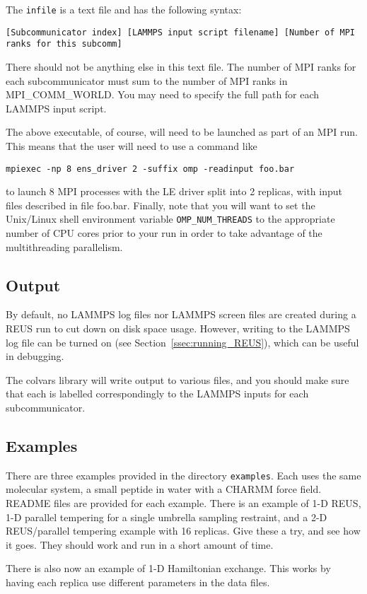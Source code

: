 \documentclass[10pt]{article}
\begin{document}
The \texttt{infile} is a text file and has the following syntax:
\begin{verbatim}
[Subcommunicator index] [LAMMPS input script filename] [Number of MPI ranks for this subcomm]
\end{verbatim}
There should not be anything else in this text file. The number of MPI ranks
for each subcommunicator must sum to the number of MPI ranks in MPI\_COMM\_WORLD. You
may need to specify the full path for each LAMMPS input script.

The above executable, of course, will need to be launched as part of an MPI run. This means
that the user will need to use a command like
\begin{verbatim}
mpiexec -np 8 ens_driver 2 -suffix omp -readinput foo.bar
\end{verbatim}
to launch 8 MPI processes with the LE driver split into 2 replicas, 
with input files described in file foo.bar.
Finally, note that you will want to
set the Unix/Linux shell environment variable \texttt{OMP\_NUM\_THREADS} to the appropriate
number of CPU cores prior to your run in order to take advantage of the multithreading parallelism. 



\subsection{Output}

By default, no LAMMPS log files nor LAMMPS screen files are created during a REUS 
run to cut down on disk space usage. However, writing to the LAMMPS log file can 
be turned on (see Section~\ref{ssec:running_REUS}), which can be useful in debugging.

The colvars library will write output to various files, and you should make sure
that each is labelled correspondingly to the LAMMPS inputs for each subcommunicator.

\subsection{Examples}

There are three examples provided in the directory \texttt{examples}. Each uses the
same molecular system, a small peptide in water with a CHARMM force field. README
files are provided for each example. There is an example of 1-D REUS, 1-D parallel
tempering for a single umbrella sampling restraint, and a 2-D REUS/parallel tempering
example with 16 replicas. Give these a try, and see how it goes. They should work and run in
a short amount of time.

There is also now an example of 1-D Hamiltonian exchange. This works by having each
replica use different parameters in the data files.
\end{document}
